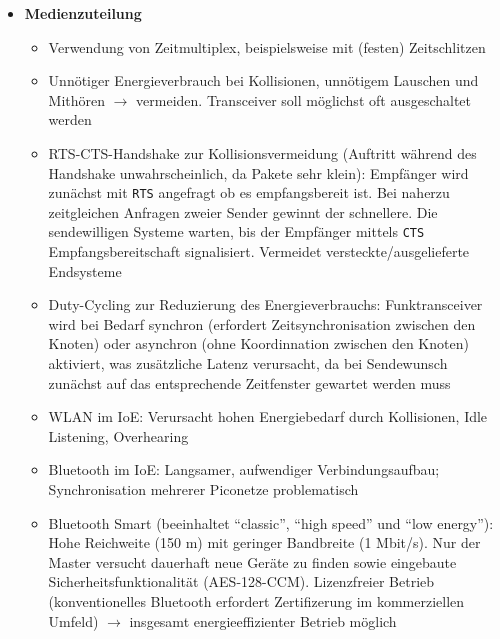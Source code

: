 \begin{itemize}
	\item \textbf{Medienzuteilung}
	\begin{itemize}
		\item Verwendung von Zeitmultiplex, beispielsweise mit (festen) Zeitschlitzen
		\item Unnötiger Energieverbrauch bei Kollisionen, unnötigem Lauschen und Mithören \(\rightarrow\) vermeiden. Transceiver soll möglichst oft ausgeschaltet werden
		\item RTS-CTS-Handshake zur Kollisionsvermeidung (Auftritt während des Handshake unwahrscheinlich, da Pakete sehr klein): Empfänger wird zunächst mit \texttt{RTS} angefragt ob es empfangsbereit ist. Bei naherzu zeitgleichen Anfragen zweier Sender gewinnt der schnellere. Die sendewilligen Systeme warten, bis der Empfänger mittels \texttt{CTS} Empfangsbereitschaft signalisiert. Vermeidet versteckte/ausgelieferte Endsysteme
		\item Duty-Cycling zur Reduzierung des Energieverbrauchs: Funktransceiver wird bei Bedarf synchron (erfordert Zeitsynchronisation zwischen den Knoten) oder asynchron (ohne Koordinnation zwischen den Knoten) aktiviert, was zusätzliche Latenz verursacht, da bei Sendewunsch zunächst auf das entsprechende Zeitfenster gewartet werden muss
		\item WLAN im IoE: Verursacht hohen Energiebedarf durch Kollisionen, Idle Listening, Overhearing
		\item Bluetooth im IoE: Langsamer, aufwendiger Verbindungsaufbau; Synchronisation mehrerer Piconetze problematisch
		\item Bluetooth Smart (beeinhaltet "`classic"', "`high speed"' und "`low energy"'): Hohe Reichweite (150 m) mit geringer Bandbreite (1 Mbit/s). Nur der Master versucht dauerhaft neue Geräte zu finden sowie eingebaute Sicherheitsfunktionalität (AES-128-CCM). Lizenzfreier Betrieb (konventionelles Bluetooth erfordert Zertifizerung im kommerziellen Umfeld) \(\rightarrow\) insgesamt energieeffizienter Betrieb möglich
	\end{itemize}
\end{itemize}

